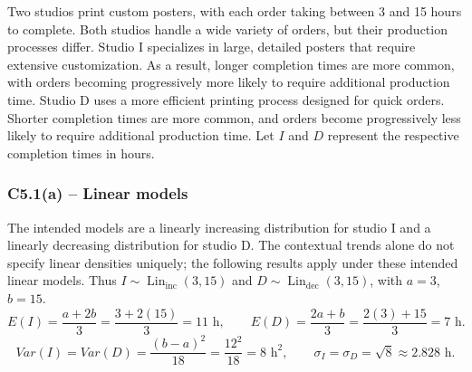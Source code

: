 {
Two studios print custom posters, with each order taking between 3 and 15 hours
to complete. Both studios handle a wide variety of orders, but their production
processes differ.
Studio I specializes in large, detailed posters that require extensive
customization. As a result, longer completion times are more common, with
orders becoming progressively more likely to require additional production
time.
Studio D uses a more efficient printing process designed for quick orders.
Shorter completion times are more common, and orders become progressively
less likely to require additional production time.
Let $I$ and $D$ represent the respective completion times in hours.
\label{sol:c5-1a}
\subsubsection*{C5.1(a) -- Linear models }
The intended models are a linearly increasing distribution for studio I
and a linearly decreasing distribution for studio D. The contextual trends
alone do not specify linear densities uniquely; the following results apply
under these intended linear models.
Thus $I\sim\operatorname{Lin}_{\mathrm{inc}}(3,15)$ and
$D\sim\operatorname{Lin}_{\mathrm{dec}}(3,15)$, with $a=3$, $b=15$.
\[
E(I)=\frac{a+2b}{3}=\frac{3+2(15)}{3}=11\text{ h},\qquad
E(D)=\frac{2a+b}{3}=\frac{2(3)+15}{3}=7\text{ h}.
\]
\[
Var(I)=Var(D)=\frac{(b-a)^2}{18}=\frac{12^2}{18}=8\text{ h}^2,
\qquad\sigma_I=\sigma_D=\sqrt{8}\approx2.828\text{ h}.
\]

}

